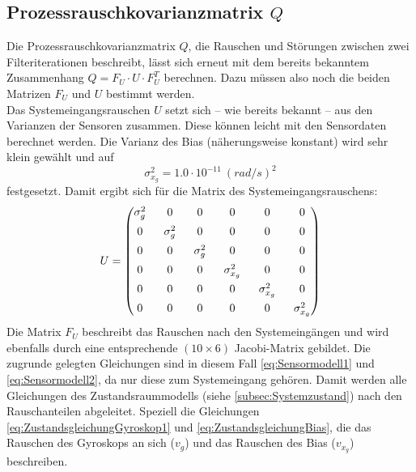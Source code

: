 \documentclass[12pt,a4paper]{article}
\begin{document}
		\subsection{Prozessrauschkovarianzmatrix $Q$}
		Die Prozessrauschkovarianzmatrix $Q$, die Rauschen und Störungen zwischen zwei Filteriterationen beschreibt, lässt sich erneut mit dem bereits bekanntem Zusammenhang $Q=F_{U}\cdot U\cdot F_{U}^{T}$ berechnen. Dazu müssen also noch die beiden Matrizen $F_{U}$ und $U$ bestimmt werden.\\
		Das Systemeingangsrauschen $U$ setzt sich -- wie bereits bekannt -- aus den Varianzen der Sensoren zusammen. Diese können leicht mit den Sensordaten berechnet werden. Die Varianz des Bias (näherungsweise konstant) wird sehr klein gewählt und auf 
		\begin{equation}
			\sigma_{x_{g}}^{2}=1.0\cdot 10^{-11}~(rad/s)^{2}
		\end{equation}
		festgesetzt.
		Damit ergibt sich für die Matrix des Systemeingangsrauschens:
		\begin{equation}
			\begin{split}
				U= 
				\setlength{\arraycolsep}{8pt}
				\begin{pmatrix}
				\sigma_{g}^{2} & 0 & 0 & 0 & 0 & 0 \\[0.5em]
				0 & \sigma_{g}^{2} & 0 & 0 & 0 & 0 \\[0.5em]
				0 & 0 & \sigma_{g}^{2} & 0 & 0 & 0 \\[0.5em]
				0 & 0 & 0 & \sigma_{x_{g}}^{2} & 0 & 0 \\[0.5em]
				0 & 0 & 0 & 0 & \sigma_{x_{g}}^{2} & 0 \\[0.5em]
				0 & 0 & 0 & 0 & 0 & \sigma_{x_{g}}^{2}
				\end{pmatrix}
			\end{split}	
		\end{equation}
		Die Matrix $F_{U}$ beschreibt das Rauschen nach den Systemeingängen und wird ebenfalls durch eine entsprechende $(10\times 6)$ Jacobi-Matrix gebildet. Die zugrunde gelegten Gleichungen sind in diesem Fall \ref{eq:Sensormodell1} und \ref{eq:Sensormodell2}, da nur diese zum Systemeingang gehören. Damit werden alle Gleichungen des Zustandsraummodells (siehe \ref{subsec:Systemzustand}) nach den Rauschanteilen abgeleitet. Speziell die Gleichungen \ref{eq:ZustandsgleichungGyroskop1} und \ref{eq:ZustandsgleichungBias}, die das Rauschen des Gyroskops an sich ($v_{g}$) und das Rauschen des Bias ($v_{x_{g}}$) beschreiben.
\end{document}
